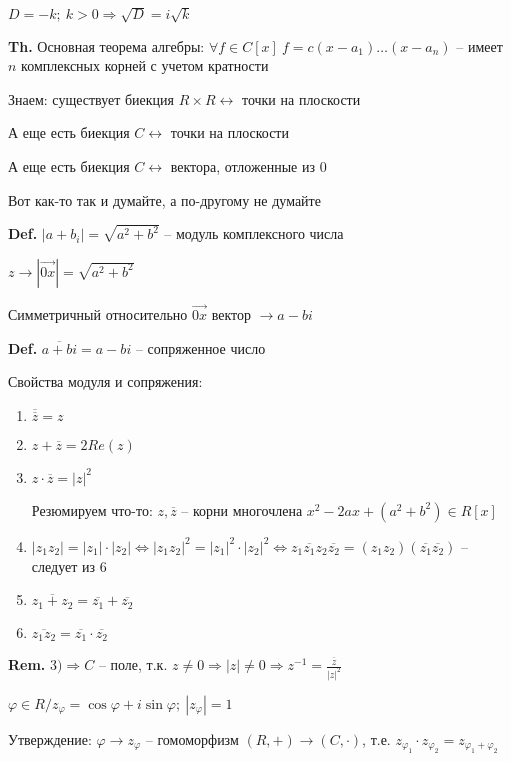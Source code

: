 \documentclass[14pt, letter paper]{article}
\begin{document}
$D = -k;\ k > 0 \Rightarrow \sqrt{D} = i\sqrt{k}$

\vspace{5mm}

\textbf{Th.} Основная теорема алгебры: $\forall f \in C[x]\ f = c(x - a_1) \ldots (x - a_n)$ -- имеет $n$ комплексных корней с учетом кратности

\vspace{3mm}

Знаем: существует биекция $R \times R \leftrightarrow$ точки на плоскости

А еще есть биекция $C \leftrightarrow$ точки на плоскости

А еще есть биекция $C \leftrightarrow$ вектора, отложенные из 0

Вот как-то так и думайте, а по-другому не думайте

\vspace{5mm}

\textbf{Def.} $|a + b_i| = \sqrt{a^2 + b^2}$ -- модуль комплексного числа

$z \rightarrow |\overrightarrow{0x}| = \sqrt{a^2 + b^2}$

Симметричный относительно $\overrightarrow{0x}$ вектор $\rightarrow a - bi$

\textbf{Def.} $\overline{a + bi} = a - bi$ -- сопряженное число

\vspace{5mm}

Свойства модуля и сопряжения:

\begin{enumerate}
    \item $\overline{\overline{z}} = z$
    \item $z + \overline{z} = 2Re(z)$
    \item $z \cdot \overline{z} = |z|^2$
    
    Резюмируем что-то: $z, \overline{z}$ -- корни многочлена $x^2 - 2ax + (a^2 + b^2) \in R[x]$
    \item $|z_1z_2| = |z_1| \cdot |z_2| \Leftrightarrow |z_1z_2|^2 = |z_1|^2 \cdot |z_2|^2 \Leftrightarrow z_1\overline{z_1}z_2\overline{z_2} = (z_1z_2)(\overline{z_1}\overline{z_2})$ -- следует из 6
    \item $\overline{z_1 + z_2} = \overline{z_1} + \overline{z_2}$
    \item $\overline{z_1z_2} = \overline{z_1} \cdot \overline{z_2}$
\end{enumerate}

\textbf{Rem.} $3) \Rightarrow C$ -- поле, т.к. $z \neq 0 \Rightarrow |z| \neq 0 \Rightarrow z^{-1} = \frac{\overline{z}}{|z|^2}$

\vspace{5mm}

$\varphi \in R/ z_\varphi = \cos \varphi + i\sin \varphi;\ |z_\varphi| = 1$

Утверждение: $\varphi \rightarrow z_\varphi$ -- гомоморфизм $(R, +) \rightarrow (C, \cdot)$, т.е. $z_{\varphi_1} \cdot z_{\varphi_2} = z_{\varphi_1 + \varphi_2}$
\end{document}
